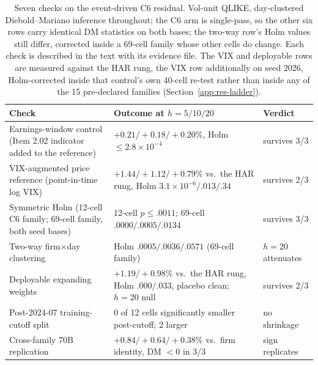 \begin{table}[tp]
\centering
\caption[Seven checks on the event-driven C6 residual]{Seven checks on the event-driven C6 residual. Vol-unit QLIKE, day-clustered Diebold--Mariano inference throughout; the C6 arm is single-pass, so the other six rows carry identical DM statistics on both bases; the two-way row's Holm values still differ, corrected inside a 69-cell family whose other cells do change. Each check is described in the text with its evidence file. The VIX and deployable rows are measured against the HAR rung, the VIX row additionally on seed 2026, Holm-corrected inside that control's own 40-cell re-test rather than inside any of the 15 pre-declared families (Section~\ref{app:res-ladder}).}
\label{tab:res-residual-checks}
{\small
\begin{tabular}{@{}p{}p{}l@{}}
\toprule
Check & Outcome at $h=5/10/20$ & Verdict \\
\midrule
Earnings-window control (Item 2.02 indicator added to the reference) & $+0.21/+0.18/+0.20\%$, Holm $\le 2.8\times10^{-4}$ & survives 3/3 \\ %
VIX-augmented price reference (point-in-time log VIX) & $+1.44/+1.12/+0.79\%$ vs.\ the HAR rung, Holm $3.1\times10^{-6}/.013/.34$ & survives 2/3 \\ %
Symmetric Holm (12-cell C6 family; 69-cell family, both seed bases) & 12-cell $p \le .0011$; 69-cell $.0000/.0005/.0134$ & survives 3/3 \\ %
Two-way firm$\times$day clustering & Holm $.0005/.0036/.0571$ (69-cell family) & $h{=}20$ attenuates \\ %
Deployable expanding weights & $+1.19/+0.98\%$ vs.\ the HAR rung, Holm $.000/.033$, placebo clean; $h{=}20$ null & survives 2/3 \\ %
Post-2024-07 training-cutoff split & 0 of 12 cells significantly smaller post-cutoff; 2 larger & no shrinkage \\ %
Cross-family 70B replication & $+0.84/+0.64/+0.38\%$ vs.\ firm identity, DM $<0$ in 3/3 & sign replicates \\ %
\bottomrule
\end{tabular}
}
\end{table}

